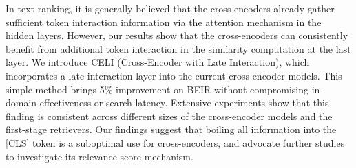 In text ranking, it is generally believed that the cross-encoders already gather sufficient token interaction information via the attention mechanism in the hidden layers. However, our results show that the cross-encoders can consistently benefit from additional token interaction in the similarity computation at the last layer. We introduce CELI (Cross-Encoder with Late Interaction), which incorporates a late interaction layer into the current cross-encoder models. This simple method brings 5\% improvement on BEIR without compromising in-domain effectiveness or search latency. Extensive experiments show that this finding is consistent across different sizes of the cross-encoder models and the first-stage retrievers. Our findings suggest that boiling all information into the [CLS] token is a suboptimal use for cross-encoders, and advocate further studies to investigate its relevance score mechanism.